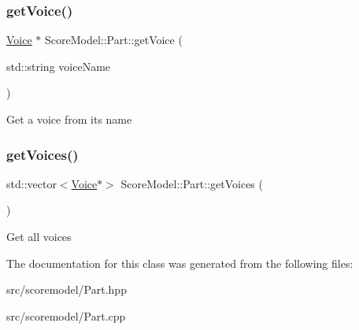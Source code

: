 \subsubsection{\texorpdfstring{getVoice()}{getVoice()}}
{\footnotesize\ttfamily \mbox{\hyperlink{classScoreModel_1_1Voice}{Voice}} $\ast$ Score\+Model\+::\+Part\+::get\+Voice (\begin{DoxyParamCaption}\item[{std\+::string}]{voice\+Name }\end{DoxyParamCaption})}

Get a voice from its name \mbox{\label{classScoreModel_1_1Part_a7b8ea977e2ade4d71c73319ac5629145}} 
\subsubsection{\texorpdfstring{getVoices()}{getVoices()}}
{\footnotesize\ttfamily std\+::vector$<$\mbox{\hyperlink{classScoreModel_1_1Voice}{Voice}}$\ast$$>$ Score\+Model\+::\+Part\+::get\+Voices (\begin{DoxyParamCaption}{ }\end{DoxyParamCaption})\hspace{0.3cm}{\ttfamily [inline]}}

Get all voices 

The documentation for this class was generated from the following files\+:\begin{DoxyCompactItemize}
\item 
src/scoremodel/Part.\+hpp\item 
src/scoremodel/Part.\+cpp\end{DoxyCompactItemize}
